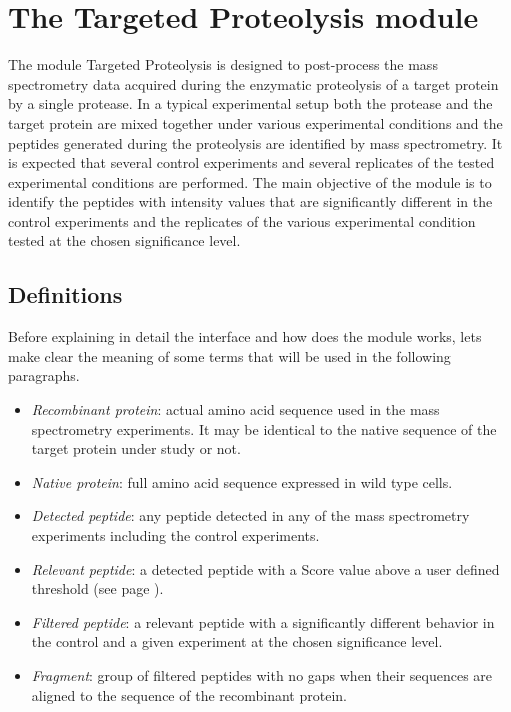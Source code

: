 \chapter{The Targeted Proteolysis module}
\label{chap:enzdig}

The module Targeted Proteolysis is designed to post-process the mass spectrometry data acquired during the enzymatic proteolysis of a target protein by a single protease. In a typical experimental setup both the protease and the target protein are mixed together under various experimental conditions and the peptides generated during the proteolysis are identified by mass spectrometry. It is expected that several control experiments and several replicates of the tested experimental conditions are performed. The main objective of the module is to identify the peptides with intensity values that are significantly different in the control experiments and the replicates of the various experimental condition tested at the chosen significance level. 

\section{Definitions}

Before explaining in detail the interface and how does the module works, lets make clear the meaning of some terms that will be used in the following paragraphs.

\begin{itemize}
	\item \textit{Recombinant protein}: actual amino acid sequence used in the mass spectrometry experiments. It may be identical to the native sequence of the target protein under study or not.
	\item \textit{Native protein}: full amino acid sequence expressed in wild type cells.
	\item \textit{Detected peptide}: any peptide detected in any of the mass spectrometry experiments including the control experiments.
	\item \textit{Relevant peptide}: a detected peptide with a Score value above a user defined threshold (see page \pageref{par:scorevalueenzdig}).
	\item \textit{Filtered peptide}: a relevant peptide with a significantly different behavior in the control and a given experiment at the chosen significance level.\label{par:PIP}
	\item \textit{Fragment}: group of filtered peptides with no gaps when their sequences are aligned to the sequence of the recombinant protein. 
\end{itemize}

